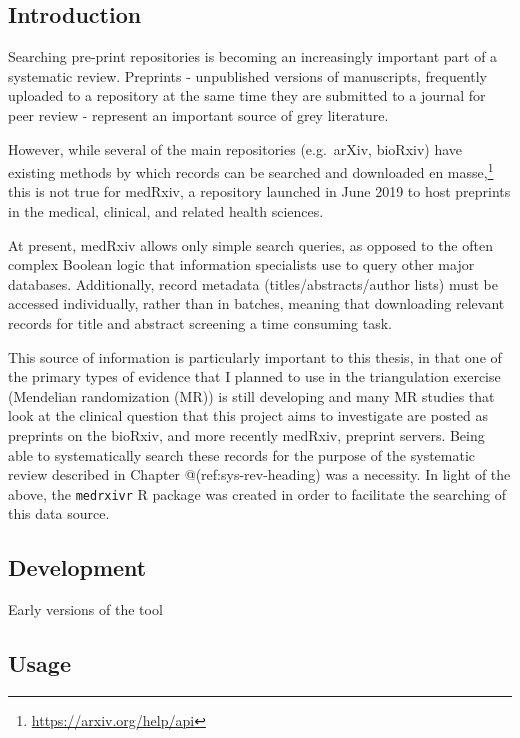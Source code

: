 \documentclass[a4paper, twoside]{templates/ociamthesis}
\begin{document}
\hypertarget{introduction-1}{%
\subsection{Introduction}\label{introduction-1}}

Searching pre-print repositories is becoming an increasingly important part of a systematic review. Preprints - unpublished versions of manuscripts, frequently uploaded to a repository at the same time they are submitted to a journal for peer review - represent an important source of grey literature.

However, while several of the main repositories (e.g.~arXiv, bioRxiv) have existing methods by which records can be searched and downloaded en masse,\footnote{\url{https://arxiv.org/help/api}} this is not true for medRxiv, a repository launched in June 2019 to host preprints in the medical, clinical, and related health sciences.

At present, medRxiv allows only simple search queries, as opposed to the often complex Boolean logic that information specialists use to query other major databases. Additionally, record metadata (titles/abstracts/author lists) must be accessed individually, rather than in batches, meaning that downloading relevant records for title and abstract screening a time consuming task.

This source of information is particularly important to this thesis, in that one of the primary types of evidence that I planned to use in the triangulation exercise (Mendelian randomization (MR)) is still developing and many MR studies that look at the clinical question that this project aims to investigate are posted as preprints on the bioRxiv, and more recently medRxiv, preprint servers. Being able to systematically search these records for the purpose of the systematic review described in Chapter @(ref:sys-rev-heading) was a necessity. In light of the above, the \texttt{medrxivr} R package was created in order to facilitate the searching of this data source.

\hypertarget{development-1}{%
\subsection{Development}\label{development-1}}

Early versions of the tool

\hypertarget{usage-1}{%
\subsection{Usage}\label{usage-1}}
\end{document}

